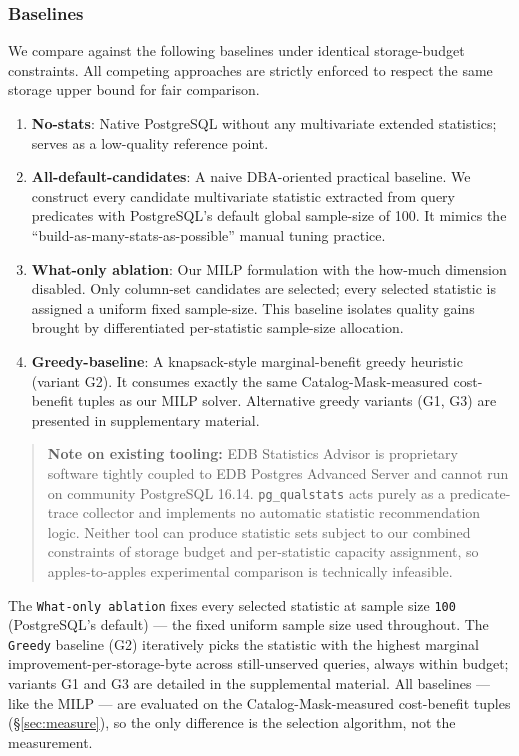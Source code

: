 \documentclass[sigconf, nonacm]{acmart}
\begin{document}
\subsubsection{Baselines}
We compare against the following baselines under identical storage-budget constraints.
All competing approaches are strictly enforced to respect the same storage upper bound for fair comparison.
\begin{enumerate}
    \item \textbf{No-stats}: Native PostgreSQL without any multivariate extended statistics; serves as a low-quality reference point.
    \item \textbf{All-default-candidates}: A naive DBA-oriented practical baseline. We construct every candidate multivariate statistic extracted from query predicates with PostgreSQL's default global sample-size of 100. It mimics the ``build-as-many-stats-as-possible'' manual tuning practice.
    \item \textbf{What-only ablation}: Our MILP formulation with the how-much dimension disabled. Only column-set candidates are selected; every selected statistic is assigned a uniform fixed sample-size. This baseline isolates quality gains brought by differentiated per-statistic sample-size allocation.
    \item \textbf{Greedy-baseline}: A knapsack-style marginal-benefit greedy heuristic (variant G2). It consumes exactly the same Catalog-Mask-measured cost-benefit tuples as our MILP solver. Alternative greedy variants (G1, G3) are presented in supplementary material.
\end{enumerate}

\begin{quote}
\noindent\textbf{Note on existing tooling:}
EDB Statistics Advisor is proprietary software tightly coupled to EDB Postgres Advanced Server and cannot run on community PostgreSQL 16.14.
\texttt{pg\_qualstats} acts purely as a predicate-trace collector and implements no automatic statistic recommendation logic.
Neither tool can produce statistic sets subject to our combined constraints of storage budget and per-statistic capacity assignment, so apples-to-apples experimental comparison is technically infeasible.
\end{quote}

The \texttt{What-only ablation} fixes every selected statistic at sample size
\texttt{100} (PostgreSQL's default) --- the fixed uniform sample size used
throughout. The \texttt{Greedy} baseline (G2) iteratively picks the statistic
with the highest marginal improvement-per-storage-byte across still-unserved
queries, always within budget; variants G1 and G3 are detailed in the
supplemental material. All baselines --- like the MILP --- are evaluated on the
Catalog-Mask-measured cost-benefit tuples (\S\ref{sec:measure}), so the only
difference is the selection algorithm, not the measurement.
\end{document}
